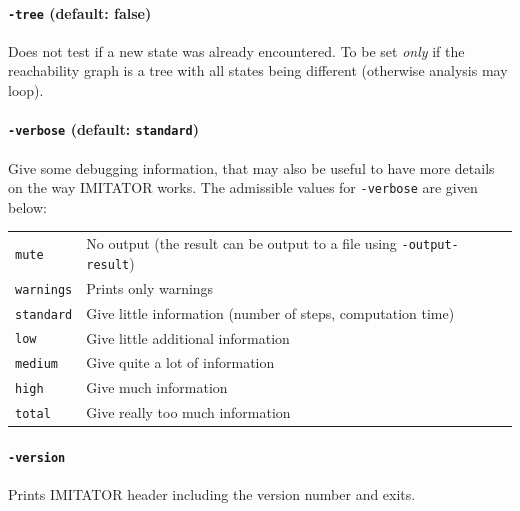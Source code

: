 \documentclass[a4paper,11pt]{report}
\newcommand{\imitator}{\textsf{IMITATOR}}
\newcommand{\styleOption}[1]{\textcolor{optioncolor}{\texttt{#1}}}
\begin{document}
\paragraph{\styleOption{-tree} (default: false)}
Does not test if a new state was already encountered.
To be set \emph{only} if the reachability graph is a tree with all states being different (otherwise analysis may loop). 




\paragraph{\styleOption{-verbose} (default: \styleOption{standard})}

Give some debugging information, that may also be useful to have more details on the way \imitator{} works.
The admissible values for \styleOption{-verbose} are given below:

\begin{tabular}{@{} l @{\ \ } l}
 \styleOption{mute} & No output (the result can be output to a file using \styleOption{-output-result}) \\
 \styleOption{warnings} & Prints only warnings \\
 \styleOption{standard} & Give little information (number of steps, computation time)\\
 \styleOption{low} & Give little additional information\\
 \styleOption{medium} & Give quite a lot of information\\
 \styleOption{high} & Give much information\\
 \styleOption{total} & Give really too much information\\
\end{tabular}


\paragraph{\styleOption{-version}}
Prints \imitator{} header including the version number and exits.



\end{document}
